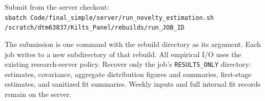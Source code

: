 \documentclass[11pt]{article}
\begin{document}
Submit from the server checkout:\\[3pt]
\texttt{sbatch Code/final\_simple/server/run\_novelty\_estimation.sh}\\
\texttt{/scratch/dtm63837/Kilts\_Panel/rebuilds/run\_JOB\_ID}

The submission is one command with the rebuild directory as its argument.
Each job writes to a new subdirectory of that rebuild. All empirical I/O uses
the existing research-server policy. Recover only the job's
\texttt{RESULTS\_ONLY} directory: estimates, covariance, aggregate distribution
figures and summaries, first-stage estimates, and sanitized fit summaries.
Weekly inputs and full internal fit records remain on the server.
\end{document}
